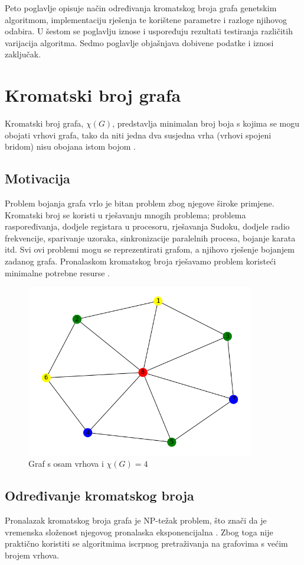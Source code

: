 \documentclass[times, utf8, zavrsni, numeric]{fer}
\begin{document}
Peto poglavlje opisuje način određivanja kromatskog broja grafa genetskim algoritmom, implementaciju rješenja te korištene parametre i razloge njihovog odabira. U šestom se poglavlju iznose i uspoređuju rezultati testiranja različitih varijacija algoritma. Sedmo poglavlje objašnjava dobivene podatke i iznosi zaključak.

\chapter{Kromatski broj grafa}
Kromatski broj grafa, $\chi(G)$, predstavlja minimalan broj boja s kojima se mogu obojati vrhovi grafa, tako da niti jedna dva susjedna vrha (vrhovi spojeni bridom) nisu obojana istom bojom \cite{kovaceviv2020diskretna}. 

\section{Motivacija}
Problem bojanja grafa vrlo je bitan problem zbog njegove široke primjene. Kromatski broj se koristi u rješavanju mnogih problema; problema raspoređivanja, dodjele registara u procesoru, rješavanja Sudoku, dodjele radio frekvencije, sparivanje uzoraka, sinkronizacije paralelnih procesa, bojanje karata itd. Svi ovi problemi mogu se reprezentirati grafom, a njihovo rješenje bojanjem zadanog grafa. Pronalaskom kromatskog broja rješavamo problem koristeći minimalne potrebne resurse \cite{rajagaspar2022applications}. 

\begin{figure}[htb]
\centering
\includegraphics[width=10cm]{images/8_vertices_example.png}
\caption{Graf s osam vrhova i $\chi(G)=4$}
\label{fig:graf s obojanim vrhovima}
\end{figure}

\section{Određivanje kromatskog broja}
Pronalazak kromatskog broja grafa je NP-težak problem, što znači da je vremenska složenost njegovog pronalaska eksponencijalna \cite{shen2003solving}. Zbog toga nije praktično koristiti se algoritmima iscrpnog pretraživanja na grafovima s većim brojem vrhova.
\end{document}
